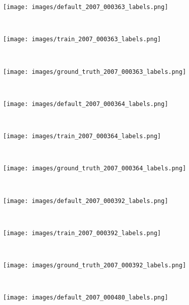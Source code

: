 \documentclass[10pt,twocolumn,letterpaper]{article}
\begin{document}
\begin{figure*}[t!]
    \begin{subfigure}[t]{0.3\textwidth}
        \centering
        \texttt{[image: images/default\_2007\_000363\_labels.png]}
    \end{subfigure}
    ~
    \begin{subfigure}[t]{0.3\textwidth}
        \centering
        \texttt{[image: images/train\_2007\_000363\_labels.png]}
    \end{subfigure}
    ~
    \begin{subfigure}[t]{0.3\textwidth}
        \centering
        \texttt{[image: images/ground\_truth\_2007\_000363\_labels.png]}
    \end{subfigure} \\
    \begin{subfigure}[t]{0.3\textwidth}
        \centering
        \texttt{[image: images/default\_2007\_000364\_labels.png]}
    \end{subfigure}
    ~
    \begin{subfigure}[t]{0.3\textwidth}
        \centering
        \texttt{[image: images/train\_2007\_000364\_labels.png]}
    \end{subfigure}
    ~
    \begin{subfigure}[t]{0.3\textwidth}
        \centering
        \texttt{[image: images/ground\_truth\_2007\_000364\_labels.png]}
    \end{subfigure} \\
    \begin{subfigure}[t]{0.3\textwidth}
        \centering
        \texttt{[image: images/default\_2007\_000392\_labels.png]}
    \end{subfigure}
    ~
    \begin{subfigure}[t]{0.3\textwidth}
        \centering
        \texttt{[image: images/train\_2007\_000392\_labels.png]}
    \end{subfigure}
    ~
    \begin{subfigure}[t]{0.3\textwidth}
        \centering
        \texttt{[image: images/ground\_truth\_2007\_000392\_labels.png]}
    \end{subfigure} \\
    \begin{subfigure}[t]{0.3\textwidth}
        \centering
        \texttt{[image: images/default\_2007\_000480\_labels.png]}
    \end{subfigure}
    ~
    \begin{subfigure}[t]{0.3\textwidth}

\end{subfigure}
\end{figure*}
\end{document}

